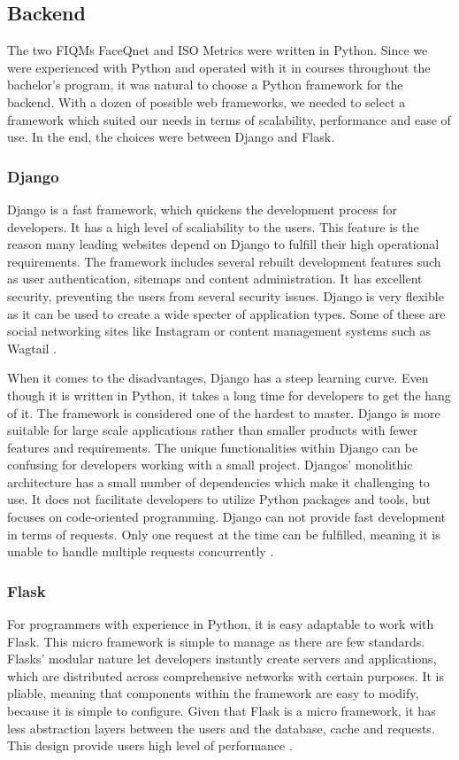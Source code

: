 \subsection{Backend}
The two FIQMs FaceQnet and ISO Metrics were written in Python. Since we were experienced with Python and operated with it in courses throughout the bachelor's program, it was natural to choose a Python framework for the backend. With a dozen of possible web frameworks, we needed to select a framework which suited our needs in terms of scalability, performance and ease of use. In the end, the choices were between Django and Flask.

\subsubsection*{Django}
Django is a fast framework, which quickens the development process for developers. It has a high level of scaliability to the users. This feature is the reason many leading websites depend on Django to fulfill their high operational requirements. The framework includes several rebuilt development features such as user authentication, sitemaps and content administration. It has excellent security, preventing the users from several security issues. Django is very flexible as it can be used to create a wide specter of application types. Some of these are social networking sites like Instagram or content management systems such as Wagtail \cite{DjangoAdvantages}.

When it comes to the disadvantages, Django has a steep learning curve. Even though it is written in Python, it takes a long time for developers to get the hang of it. The framework is considered one of the hardest to master. Django is more suitable for large scale applications rather than smaller products with fewer features and requirements. The unique functionalities within Django can be confusing for developers working with a small project. Djangos' monolithic architecture has a small number of dependencies which make it challenging to use. It does not facilitate developers to utilize Python packages and tools, but focuses on code-oriented programming. Django can not provide fast development in terms of requests. Only one request at the time can be fulfilled, meaning it is unable to handle multiple requests concurrently \cite{DjangoDisadvantages}.

\subsubsection*{Flask}
\label{sec:flask}
For programmers with experience in Python, it is easy adaptable to work with Flask. This micro framework is simple to manage as there are few standards. Flasks' modular nature let developers instantly create servers and applications, which are distributed across comprehensive networks with certain purposes. It is pliable, meaning that components within the framework are easy to modify, because it is simple to configure. Given that Flask is a micro framework, it has less abstraction layers between the users and the database, cache and requests. This design provide users high level of performance \cite{DjangoAdvantages}.

